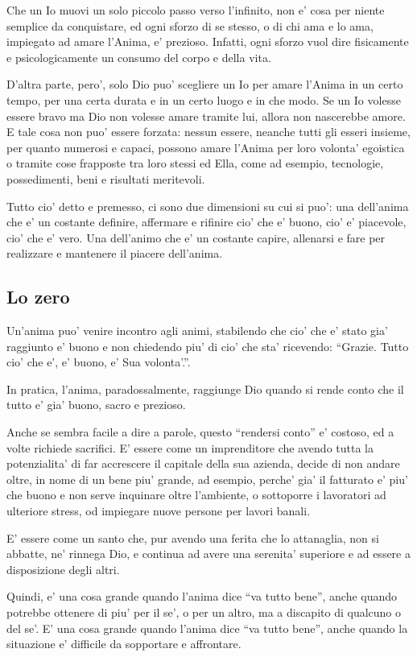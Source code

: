 Che un Io muovi un solo piccolo passo verso l'infinito, non e' cosa per niente semplice da conquistare, ed ogni sforzo di se stesso, o di chi ama e lo ama, impiegato ad amare l'Anima, e' prezioso. Infatti, ogni sforzo vuol dire fisicamente e psicologicamente un consumo del corpo e della vita.

D'altra parte, pero', solo Dio puo' scegliere un Io per amare l'Anima in un certo tempo, per una certa durata e in un certo luogo e in che modo. Se un Io volesse essere bravo ma Dio non volesse amare tramite lui, allora non nascerebbe amore. E tale cosa non puo' essere forzata: nessun essere, neanche tutti gli esseri insieme, per quanto numerosi e capaci, possono amare l'Anima per loro volonta' egoistica o tramite cose frapposte tra loro stessi ed Ella, come ad esempio, tecnologie, possedimenti, beni e risultati meritevoli. 

Tutto cio' detto e premesso, ci sono due dimensioni su cui si puo': una dell'anima che e' un costante definire, affermare e rifinire cio' che e' buono, cio' e' piacevole, cio' che e' vero. Una dell'animo che e' un costante capire, allenarsi e fare per realizzare e mantenere il piacere dell'anima.

\subsection{Lo zero}
\label{loZero}
Un'anima puo' venire incontro agli animi, stabilendo che cio' che e' stato gia' raggiunto e' buono e non chiedendo piu' di cio' che sta' ricevendo: ``Grazie. Tutto cio' che e', e' buono, e' Sua volonta'.''.

In pratica, l'anima, paradossalmente, raggiunge Dio quando si rende conto che il tutto e' gia' buono, sacro e prezioso.

Anche se sembra facile a dire a parole, questo ``rendersi conto'' e' costoso, ed a volte richiede sacrifici. E' essere come un imprenditore che avendo tutta la potenzialita' di far accrescere il capitale della sua azienda, decide di non andare oltre, in nome di un bene piu' grande, ad esempio, perche' gia' il fatturato e' piu' che buono e non serve inquinare oltre l'ambiente, o sottoporre i lavoratori ad ulteriore stress, od impiegare nuove persone per lavori banali.

E' essere come un santo che, pur avendo una ferita che lo attanaglia, non si abbatte, ne' rinnega Dio, e continua ad avere una serenita' superiore e ad essere a disposizione degli altri.

Quindi, e' una cosa grande quando l'anima dice ``va tutto bene'', anche quando potrebbe ottenere di piu' per il se', o per un altro, ma a discapito di qualcuno o del se'. E' una cosa grande quando l'anima dice ``va tutto bene'', anche quando la situazione e' difficile da sopportare e affrontare.

